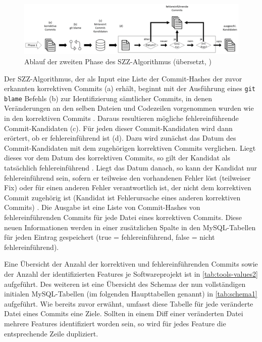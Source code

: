 \begin{figure}[t]
    \centering
    \includegraphics[width=\textwidth]{images/SZZ}
    \caption{Ablauf der zweiten Phase des SZZ-Algorithmus (übersetzt, \cite{Borg2019})\label{fig:szz}}
\end{figure}

Der SZZ-Algorithmus, der als Input eine Liste der Commit-Hashes der zuvor erkannten korrektiven Commits (a) erhält, beginnt mit der Ausführung eines \texttt{git blame} Befehls (b) zur Identifizierung sämtlicher Commits, in denen Veränderungen an den selben Dateien und Codezeilen vorgenommen wurden wie in den korrektiven Commits \cite{Borg2019}. Daraus resultieren mögliche fehlereinführende Commit-Kandidaten (c). Für jeden dieser Commit-Kandidaten wird dann erörtert, ob er fehlereinführend ist (d). Dazu wird zunächst das Datum des Commit-Kandidaten mit dem zugehörigen korrektiven Commits verglichen. Liegt dieses vor dem Datum des korrektiven Commits, so gilt der Kandidat als tatsächlich fehlereinführend \cite{Borg2019}. Liegt das Datum danach, so kann der Kandidat nur fehlereinführend sein, sofern er teilweise den vorhandenen Fehler löst (teilweiser Fix) oder für einen anderen Fehler verantwortlich ist, der nicht dem korrektiven Commit zugehörig ist (Kandidat ist Fehlerursache eines anderen korrektiven Commits) \cite{Borg2019}. Die Ausgabe ist eine Liste von Commit-Hashes von fehlereinführenden Commits für jede Datei eines korrektiven Commits. Diese neuen Informationen werden in einer zusätzlichen Spalte in den MySQL-Tabellen für jeden Eintrag gespeichert (true = fehlereinführend, false = nicht fehlereinführend). 

Eine Übersicht der Anzahl der korrektiven und fehlereinführenden Commits sowie der Anzahl der identifizierten Features je Softwareprojekt ist in \autoref{tab:tools-values2} aufgeführt. Des weiteren ist eine Übersicht des Schemas der nun vollständigen initialen MySQL-Tabellen (im folgenden Haupttabellen genannt) in \autoref{tab:schema1} aufgeführt. Wie bereits zuvor erwähnt, umfasst diese Tabelle für jede veränderte Datei eines Commits eine Ziele. Sollten in einem Diff einer veränderten Datei mehrere Features identifiziert worden sein, so wird für jedes Feature die entsprechende Zeile dupliziert.

